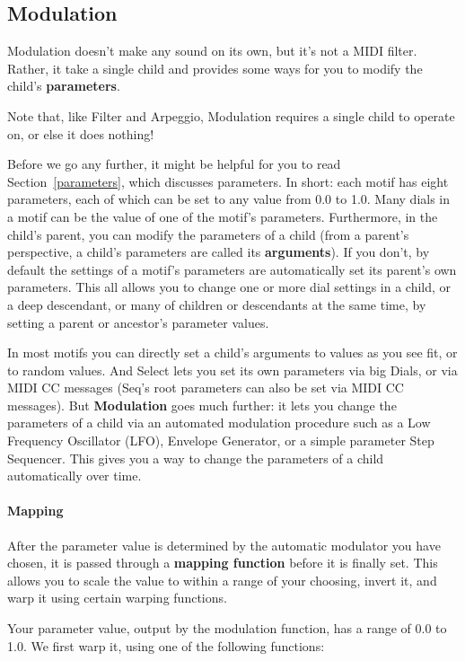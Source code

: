 \documentclass[twoside,10pt]{article}
\begin{document}
\subsection{Modulation}

Modulation doesn't make any sound on its own, but it's not a MIDI filter.  Rather, it take a single child and provides some ways for you to modify the child's {\bf parameters}.

Note that, like Filter and Arpeggio, Modulation requires a single child to operate on, or else it does nothing!

Before we go any further, it might be helpful for you to read Section~\ref{parameters}, which discusses parameters.  In short: each motif has eight parameters, each of which can be set to any value from 0.0 to 1.0.  Many dials in a motif can be the value of one of the motif's parameters.  Furthermore, in the child's parent, you can modify the parameters of a child (from a parent's perspective, a child's parameters are called its {\bf arguments}).  If you don't, by default the settings of a motif's parameters are automatically set its parent's own parameters. This all allows you to change one or more dial settings in a child, or a deep descendant, or many of children or descendants at the same time, by setting a parent or ancestor's parameter values.

In most motifs you can directly set a child's arguments to values as you see fit, or to random values.  And Select lets you set its own parameters via big Dials, or via MIDI CC messages (Seq's root parameters can also be set via MIDI CC messages).  But {\bf Modulation} goes much further: it lets you change the parameters of a child via an automated modulation procedure such as a Low Frequency Oscillator (LFO), Envelope Generator, or a simple parameter Step Sequencer.  This gives you a way to change the parameters of a child automatically over time.


\paragraph{Mapping}

After the parameter value is determined by the automatic modulator you have chosen, it is passed through a {\bf mapping function} before it is finally set.  This allows you to scale the value to within a range of your choosing, invert it, and warp it using certain warping functions.

Your parameter value, output by the modulation function, has a range of 0.0 to 1.0.  We first warp it, using one of the following functions:
\end{document}
